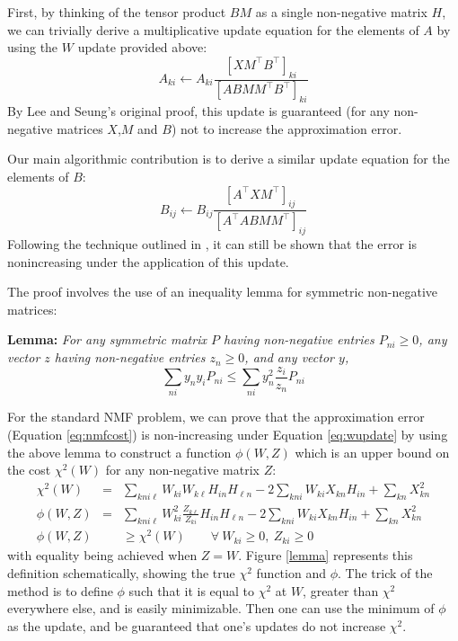 \documentclass[10pt,preprint]{aastex}
\newcommand{\T}{^{\scriptscriptstyle \top}}
\newcommand{\XX}{X}
\newcommand{\Xkn}{X_{kn}}
\renewcommand{\AA}{A}
\newcommand{\WW}{W}
\newcommand{\Wki}{W_{ki}}
\newcommand{\Wkl}{W_{k\ell}}
\newcommand{\HH}{H}
\newcommand{\Hin}{H_{in}}
\newcommand{\Hln}{H_{\ell{}n}}
\newcommand{\BB}{B}
\newcommand{\MM}{M}
\newcommand{\Aki}{A_{ki}}
\newcommand{\Bij}{B_{ij}}
\newcommand{\PP}{P}
\newcommand{\Pni}{P_{ni}}
\newcommand{\ZZ}{Z}
\newcommand{\Zki}{Z_{ki}}
\newcommand{\Zkl}{Z_{k\ell}}
\newcommand{\zz}{z}
\newcommand{\yy}{y}
\newcommand{\yn}{y_n}
\newcommand{\yi}{y_i}
\newcommand{\zn}{z_n}
\newcommand{\zi}{z_i}
\begin{document}
First, by thinking of the tensor product $\BB\MM$ as a single
non-negative matrix $\HH$, we can trivially derive a multiplicative
update equation for the elements of $\AA$ by using the $\WW$ update
provided above: 
\begin{equation}
\Aki \leftarrow \Aki 
\frac{[\XX\MM\T\BB\T]_{ki}}{[\AA\BB\MM\MM\T\BB\T]_{ki}}
\end{equation}
By Lee and Seung's original proof, this update is guaranteed (for any
non-negative matrices $\XX$,$\MM$ and $\BB$) not to increase the
approximation error. 

Our main algorithmic contribution is to derive a similar update equation
for the elements of $\BB$:
\begin{equation} \label{eq:bupdate}
\Bij \leftarrow \Bij
\frac{[\AA\T\XX\MM\T]_{ij}}{[\AA\T\AA\BB\MM\MM\T]_{ij}}
\end{equation}
Following the technique outlined in \cite{lee00a}, it can still be shown
that the error is nonincreasing under the application of this update.

The proof involves the use of an inequality lemma for symmetric
non-negative matrices:

{\bf Lemma:} 
{\it For any symmetric matrix $\PP$ having non-negative entries $\Pni
\geq 0$, any vector $\zz$ having non-negative entries $\zn \geq 0$,
and any vector $\yy$,}
\begin{equation}
\sum_{ni} \yn \yi \Pni \leq \sum_{ni} \yn^2 \frac{\zi}{\zn} \Pni 
\end{equation}

For the standard NMF problem, we can prove that the approximation
error (Equation \ref{eq:nmfcost}) is non-increasing under Equation
\ref{eq:wupdate} by using the above lemma to construct a function
$\phi(\WW,\ZZ)$ which is an upper bound on the cost $\chi^2(\WW)$ for
any non-negative matrix $\ZZ$: {\small
\begin{eqnarray} 
\chi^2(\WW) &=& \sum_{kni\ell} \Wki\Wkl \Hin\Hln
- 2 \sum_{kni} \Wki \Xkn \Hin + \sum_{kn} \Xkn^2 \\
\phi(\WW,\ZZ) &=& \sum_{kni\ell} \Wki^2\frac{\Zkl}{\Zki} \Hin\Hln 
- 2 \sum_{kni} \Wki \Xkn \Hin + \sum_{kn} \Xkn^2 \\
\phi(\WW,\ZZ) 
&&\geq \chi^2(\WW) \qquad \forall \: \Wki\geq 0,\: \Zki\geq 0
\end{eqnarray}
} with equality being achieved when $\ZZ=\WW$. Figure \ref{lemma}
represents this definition schematically, showing the true $\chi^2$
function and $\phi$. The trick of the method is to define $\phi$ such
that it is equal to $\chi^2$ at $W$, greater than $\chi^2$ everywhere
else, and is easily minimizable. Then one can use the minimum of
$\phi$ as the update, and be guaranteed that one's updates do not
increase $\chi^2$.
\end{document}
